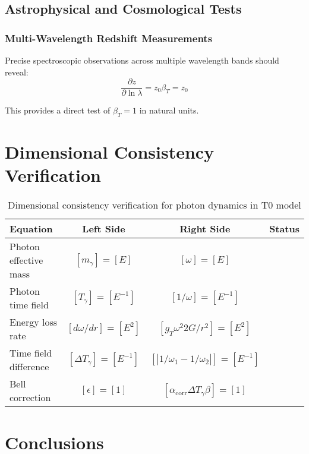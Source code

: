 \documentclass[12pt,a4paper]{article}
\begin{document}
	\subsection{Astrophysical and Cosmological Tests}
	
	\subsubsection{Multi-Wavelength Redshift Measurements}
	
	Precise spectroscopic observations across multiple wavelength bands should reveal:
	\begin{equation}
		\frac{\partial z}{\partial \ln\lambda} = z_0 \beta_T = z_0
		\label{eq:redshift_wavelength_derivative}
	\end{equation}
	
	This provides a direct test of $\beta_T = 1$ in natural units.
	
	\section{Dimensional Consistency Verification}
	
	\begin{table}[htbp]
		\centering
		\begin{tabular}{lccl}
			\toprule
			\textbf{Equation} & \textbf{Left Side} & \textbf{Right Side} & \textbf{Status} \\
			\midrule
			Photon effective mass & $[m_\gamma] = [E]$ & $[\omega] = [E]$ & \checkmark \\
			Photon time field & $[T_\gamma] = [E^{-1}]$ & $[1/\omega] = [E^{-1}]$ & \checkmark \\
			Energy loss rate & $[d\omega/dr] = [E^2]$ & $[g_T \omega^2 2G/r^2] = [E^2]$ & \checkmark \\
			Time field difference & $[\Delta T_\gamma] = [E^{-1}]$ & $[|1/\omega_1 - 1/\omega_2|] = [E^{-1}]$ & \checkmark \\
			Bell correction & $[\epsilon] = [1]$ & $[\alpha_{\text{corr}} \Delta T_\gamma \beta] = [1]$ & \checkmark \\
			\bottomrule
		\end{tabular}
		\caption{Dimensional consistency verification for photon dynamics in T0 model}
	\end{table}
	
	\section{Conclusions}
	
\end{document}
